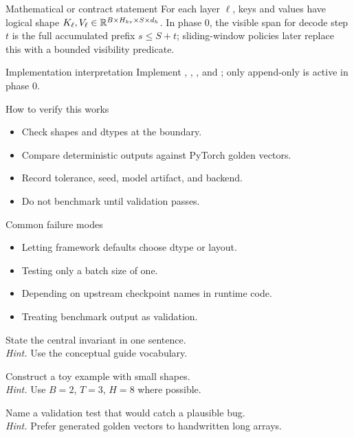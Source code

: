 \begin{definitionbox}{Mathematical or contract statement}
For each layer \(\ell\), keys and values have logical shape \(K_\ell,V_\ell\in\mathbb{R}^{B\times H_{kv}\times S\times d_h}\). In phase 0, the visible span for decode step \(t\) is the full accumulated prefix \(s\leq S+t\); sliding-window policies later replace this with a bounded visibility predicate.
\end{definitionbox}

\begin{implementationbox}{Implementation interpretation}
Implement , , , and ; only append-only is active in phase 0.
\end{implementationbox}

\begin{verificationbox}{How to verify this works}
\begin{itemize}
\item Check shapes and dtypes at the boundary.
\item Compare deterministic outputs against PyTorch golden vectors.
\item Record tolerance, seed, model artifact, and backend.
\item Do not benchmark until validation passes.
\end{itemize}
\end{verificationbox}

\begin{warningbox}{Common failure modes}
\begin{itemize}
\item Letting framework defaults choose dtype or layout.
\item Testing only a batch size of one.
\item Depending on upstream checkpoint names in runtime code.
\item Treating benchmark output as validation.
\end{itemize}
\end{warningbox}

\begin{chapterexercises}
\item State the central invariant in one sentence.\\
\textit{Hint.} Use the conceptual guide vocabulary.
\item Construct a toy example with small shapes.\\
\textit{Hint.} Use $B=2$, $T=3$, $H=8$ where possible.
\item Name a validation test that would catch a plausible bug.\\
\textit{Hint.} Prefer generated golden vectors to handwritten long arrays.
\end{chapterexercises}

